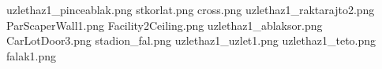 uzlethaz1_pinceablak.png
stkorlat.png
cross.png
uzlethaz1_raktarajto2.png
ParScaperWall1.png
Facility2Ceiling.png
uzlethaz1_ablaksor.png
CarLotDoor3.png
stadion_fal.png
uzlethaz1_uzlet1.png
uzlethaz1_teto.png
falak1.png
